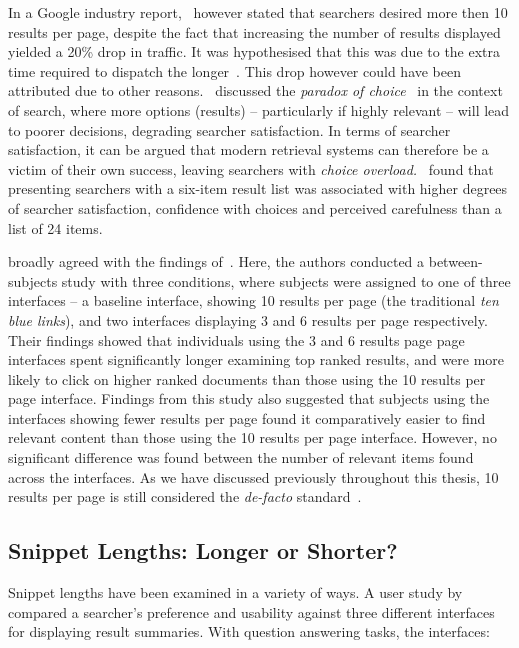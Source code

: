 In a Google industry report,~\cite{linden2006} however stated that searchers desired more then 10 results per page, despite the fact that increasing the number of results displayed yielded a 20\% drop in traffic. It was hypothesised that this was due to the extra time required to dispatch the longer~. This drop however could have been attributed due to other reasons.~\cite{oulasvirta2009serp_size} discussed the \emph{paradox of choice}~\citep{schwartz2005paradox_of_choice} in the context of search, where more options (results) -- particularly if highly relevant -- will lead to poorer decisions, degrading searcher satisfaction. In terms of searcher satisfaction, it can be argued that modern retrieval systems can therefore be a victim of their own success, leaving searchers with \emph{choice overload.}~\cite{oulasvirta2009serp_size} found that presenting searchers with a six-item result list was associated with higher degrees of searcher satisfaction, confidence with choices and perceived carefulness than a list of 24 items.

\cite{kelly2015serp_size} broadly agreed with the findings of~\cite{oulasvirta2009serp_size}. Here, the authors conducted a between-subjects study with three conditions, where subjects were assigned to one of three interfaces -- a baseline interface, showing 10 results per page (the traditional \emph{ten blue links}), and two interfaces displaying 3 and 6 results per page respectively. Their findings showed that individuals using the 3 and 6 results page page interfaces spent significantly longer examining top ranked results, and were more likely to click on higher ranked documents than those using the 10 results per page interface. Findings from this study also suggested that subjects using the interfaces showing fewer results per page found it comparatively easier to find relevant content than those using the 10 results per page interface. However, no significant difference was found between the number of relevant items found across the interfaces. As we have discussed previously throughout this thesis, 10 results per page is still considered the \emph{de-facto} standard~\citep{hearst2009_search}.

\subsection{Snippet Lengths: Longer or Shorter?}
Snippet lengths have been examined in a variety of ways. A user study by~\cite{paek2004wavelens} compared a searcher's preference and usability against three different interfaces for displaying result summaries. With question answering tasks, the interfaces:

